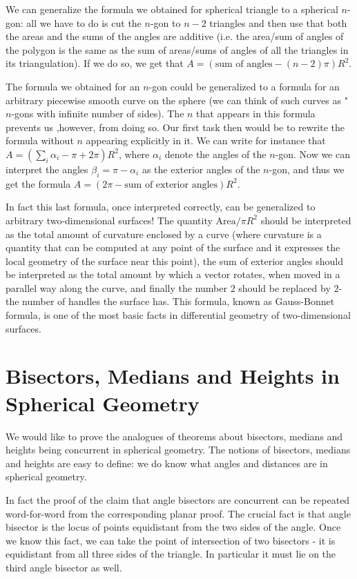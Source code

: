 We can generalize the formula we obtained for spherical triangle to a spherical $n$-gon: all we have to do is cut the $n$-gon to $n-2$ triangles and then use that both the areas and the sums of the angles are additive (i.e. the area/sum of angles of the polygon is the same as the sum of areas/sums of angles of all the triangles in its triangulation). If we do so, we get that $A=(\text{sum of angles}-(n-2)\pi)R^2$.

The formula we obtained for an $n$-gon could be generalized to a formula for an arbitrary piecewise smooth curve on the sphere (we can think of such curves as "$n$-gons with infinite number of sides). The $n$ that appears in this formula prevents us ,however, from doing so. Our first task then would be to rewrite the formula without $n$ appearing explicitly in it. We can write for instance that $A=(\sum_i{\alpha_i - \pi}+2\pi)R^2$, where $\alpha_i$ denote the angles of the $n$-gon. Now we can interpret the angles $\beta_i=\pi-\alpha_i$ as the exterior angles of the $n$-gon, and thus we get the formula $A=(2\pi-\text{sum of exterior angles})R^2$.

In fact this last formula, once interpreted correctly, can be generalized to arbitrary two-dimensional surfaces! The quantity $\text{Area}/\pi R^2$ should be interpreted as the total amount of curvature enclosed by a curve (where curvature is a quantity that can be computed at any point of the surface and it expresses the local geometry of the surface near this point), the sum of exterior angles should be interpreted as the total amount by which a vector rotates, when moved in a parallel way along the curve, and finally the number $2$ should be replaced by $2$-the number of handles the surface has. This formula, known as Gauss-Bonnet formula, is one of the most basic facts in differential geometry of two-dimensional surfaces.

\section{Bisectors, Medians and Heights in Spherical Geometry}

We would like to prove the analogues of theorems about bisectors, medians and heights being concurrent in spherical geometry. The notions of bisectors, medians and heights are easy to define: we do know what angles and distances are in spherical geometry.

In fact the proof of the claim that angle bisectors are concurrent can be repeated word-for-word from the corresponding planar proof. The crucial fact is that angle bisector is the locus of points equidistant from the two sides of the angle. Once we know this fact, we can take the point of intersection of two bisectors - it is equidistant from all three sides of the triangle. In particular it must lie on the third angle bisector as well.

